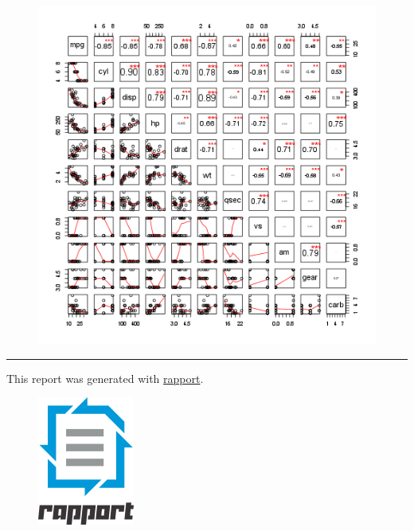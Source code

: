 \documentclass{article}
\makeatletter
\def\maxwidth{\ifdim\Gin@nat@width>\linewidth\linewidth
\else\Gin@nat@width\fi}
\let\Oldincludegraphics\includegraphics
\renewcommand{\includegraphics}[1]{\Oldincludegraphics[width=\maxwidth]{#1}}
\makeatother
\begin{document}
\begin{figure}[htbp]
\centering
\includegraphics{ce42e944b62284a3bebf2101155af100.png}
\caption{}
\end{figure}

\begin{center}\rule{3in}{0.4pt}\end{center}

This report was generated with
\href{http://rapport-package.info/}{rapport}.

\begin{figure}[htbp]
\centering
\includegraphics{images/rapport.png}
\caption{}
\end{figure}
\end{document}

